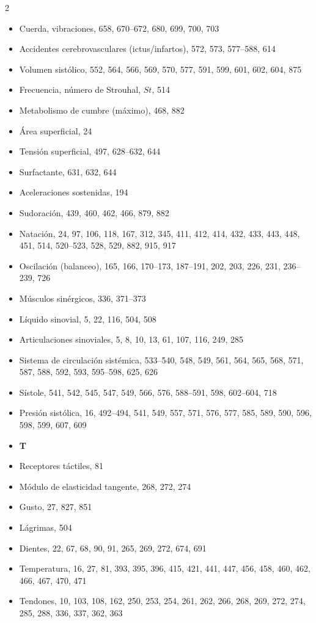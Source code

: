 \documentclass[12pt,a4paper]{book}
\begin{document}
\begin{multicols}{2}
\begin{itemize}[leftmargin=*]
  \item Cuerda, vibraciones, 658, 670--672, 680, 699, 700, 703
  \item Accidentes cerebrovasculares (ictus/infartos), 572, 573, 577--588, 614
  \item Volumen sistólico, 552, 564, 566, 569, 570, 577, 591, 599, 601, 602, 604, 875
  \item Frecuencia, número de Strouhal, $St$, 514
  \item Metabolismo de cumbre (máximo), 468, 882
  \item Área superficial, 24
  \item Tensión superficial, 497, 628--632, 644
  \item Surfactante, 631, 632, 644
  \item Aceleraciones sostenidas, 194
  \item Sudoración, 439, 460, 462, 466, 879, 882
  \item Natación, 24, 97, 106, 118, 167, 312, 345, 411, 412, 414, 432, 433, 443, 448, 451, 514, 520--523, 528, 529, 882, 915, 917
  \item Oscilación (balanceo), 165, 166, 170--173, 187--191, 202, 203, 226, 231, 236--239, 726
  \item Músculos sinérgicos, 336, 371--373
  \item Líquido sinovial, 5, 22, 116, 504, 508
  \item Articulaciones sinoviales, 5, 8, 10, 13, 61, 107, 116, 249, 285
  \item Sistema de circulación sistémica, 533--540, 548, 549, 561, 564, 565, 568, 571, 587, 588, 592, 593, 595--598, 625, 626
  \item Sístole, 541, 542, 545, 547, 549, 566, 576, 588--591, 598, 602--604, 718
  \item Presión sistólica, 16, 492--494, 541, 549, 557, 571, 576, 577, 585, 589, 590, 596, 598, 599, 607, 609
  \item \textbf{T}
  \item Receptores táctiles, 81
  \item Módulo de elasticidad tangente, 268, 272, 274
  \item Gusto, 27, 827, 851
  \item Lágrimas, 504
  \item Dientes, 22, 67, 68, 90, 91, 265, 269, 272, 674, 691
  \item Temperatura, 16, 27, 81, 393, 395, 396, 415, 421, 441, 447, 456, 458, 460, 462, 466, 467, 470, 471
  \item Tendones, 10, 103, 108, 162, 250, 253, 254, 261, 262, 266, 268, 269, 272, 274, 285, 288, 336, 337, 362, 363

\end{itemize}
\end{multicols}
\end{document}
